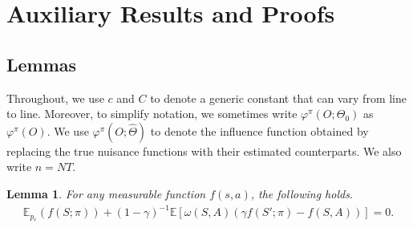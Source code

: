 \documentclass[12pt]{article}
\newcommand{\0}{\boldsymbol{0}}
\newtheorem{lemma}{Lemma}
\newcommand{\E}{\mathbb{E}}
\newcommand{\ZB}[1]{{\color{cyan}{ #1}}}
\begin{document}






\appendix


\newpage

\section{Auxiliary Results and Proofs}

\subsection{Lemmas}

Throughout, we use $c$ and $C$ to denote a generic constant that can vary from line to line. Moreover, to simplify notation, we sometimes write $\varphi^\pi(O;\Theta_0)$ as $\varphi^\pi(O)$. We use $\varphi^\pi(O;\widehat\Theta)$ to denote the influence function obtained by replacing the true nuisance functions with their estimated counterparts.  We also write \(n=NT\).


\begin{lemma} \label{lemma:balancing}
For any measurable function $f(s,a)$, the following holds.
    \begin{gather*}
        \E_{p_e}(f(S;\pi))+(1-\gamma)^{-1}\E\left[\omega(S,A)(\gamma f(S';\pi)-f(S,A)) \right]=0. 
    \end{gather*}
\end{lemma}
\end{document}
